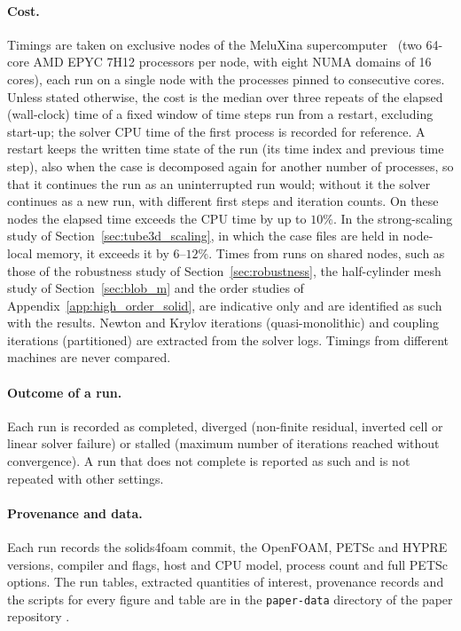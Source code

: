 \paragraph{Cost.}
Timings are taken on exclusive nodes of the MeluXina supercomputer~\citep{MeluXina} (two 64-core AMD EPYC 7H12 processors per node, with eight NUMA domains of 16 cores), each run on a single node with the processes pinned to consecutive cores.
Unless stated otherwise, the cost is the median over three repeats of the elapsed (wall-clock) time of a fixed window of time steps run from a restart, excluding start-up; the solver CPU time of the first process is recorded for reference.
A restart keeps the written time state of the run (its time index and previous time step), also when the case is decomposed again for another number of processes, so that it continues the run as an uninterrupted run would; without it the solver continues as a new run, with different first steps and iteration counts.
On these nodes the elapsed time exceeds the CPU time by up to $10\%$.
In the strong-scaling study of Section~\ref{sec:tube3d_scaling}, in which the case files are held in node-local memory, it exceeds it by $6$--$12\%$.
Times from runs on shared nodes, such as those of the robustness study of Section~\ref{sec:robustness}, the half-cylinder mesh study of Section~\ref{sec:blob_m} and the order studies of Appendix~\ref{app:high_order_solid}, are indicative only and are identified as such with the results.
Newton and Krylov iterations (quasi-monolithic) and coupling iterations (partitioned) are extracted from the solver logs.
Timings from different machines are never compared.

\paragraph{Outcome of a run.}
Each run is recorded as completed, diverged (non-finite residual, inverted cell or linear solver failure) or stalled (maximum number of iterations reached without convergence).
A run that does not complete is reported as such and is not repeated with other settings.

\paragraph{Provenance and data.}
Each run records the solids4foam commit, the OpenFOAM, PETSc and HYPRE versions, compiler and flags, host and CPU model, process count and full PETSc options.
The run tables, extracted quantities of interest, provenance records and the scripts for every figure and table are in the \texttt{paper-data} directory of the paper repository .


